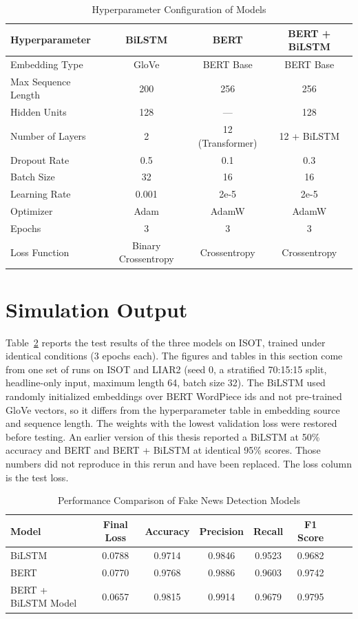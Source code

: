 \begin{table}[H]
\centering
\caption{Hyperparameter Configuration of Models}
\label{tab:hyperparameters}
\small
\begin{tabular}{|l|c|c|c|}
\hline
\textbf{Hyperparameter} & \textbf{BiLSTM} & \textbf{BERT} & \textbf{BERT + BiLSTM} \\ \hline
Embedding Type & GloVe & BERT Base & BERT Base \\ \hline
Max Sequence Length & 200 & 256 & 256 \\ \hline
Hidden Units & 128 & --- & 128 \\ \hline
Number of Layers & 2 & 12 (Transformer) & 12 + BiLSTM \\ \hline
Dropout Rate & 0.5 & 0.1 & 0.3 \\ \hline
Batch Size & 32 & 16 & 16 \\ \hline
Learning Rate & 0.001 & 2e-5 & 2e-5 \\ \hline
Optimizer & Adam & AdamW & AdamW \\ \hline
Epochs & 3 & 3 & 3 \\ \hline
Loss Function & Binary Crossentropy & Crossentropy & Crossentropy \\ \hline
\end{tabular}
\end{table}

\section{Simulation Output}

Table~\ref{tab:comparison} reports the test results of the three models on ISOT, trained under identical conditions (3 epochs each). The figures and tables in this section come from one set of runs on ISOT and LIAR2 (seed 0, a stratified 70:15:15 split, headline-only input, maximum length 64, batch size 32). The BiLSTM used randomly initialized embeddings over BERT WordPiece ids and not pre-trained GloVe vectors, so it differs from the hyperparameter table in embedding source and sequence length. The weights with the lowest validation loss were restored before testing. An earlier version of this thesis reported a BiLSTM at 50\% accuracy and BERT and BERT + BiLSTM at identical 95\% scores. Those numbers did not reproduce in this rerun and have been replaced. The loss column is the test loss.

\begin{table}[h]
\centering
\caption{Performance Comparison of Fake News Detection Models}
\label{tab:comparison}
\small
\begin{tabular}{p{}ccccccp{}}
\hline
 \textbf{Model} & \textbf{Final Loss} & \textbf{Accuracy} & \textbf{Precision} & \textbf{Recall} & \textbf{F1 Score} \\ \hline
 BiLSTM & 0.0788 & 0.9714 & 0.9846 & 0.9523 & 0.9682 \\
 BERT & 0.0770 & 0.9768 & 0.9886 & 0.9603 & 0.9742 \\
 BERT + BiLSTM Model & 0.0657 & 0.9815 & 0.9914 & 0.9679 & 0.9795 \\ \hline
\end{tabular}
\end{table}

